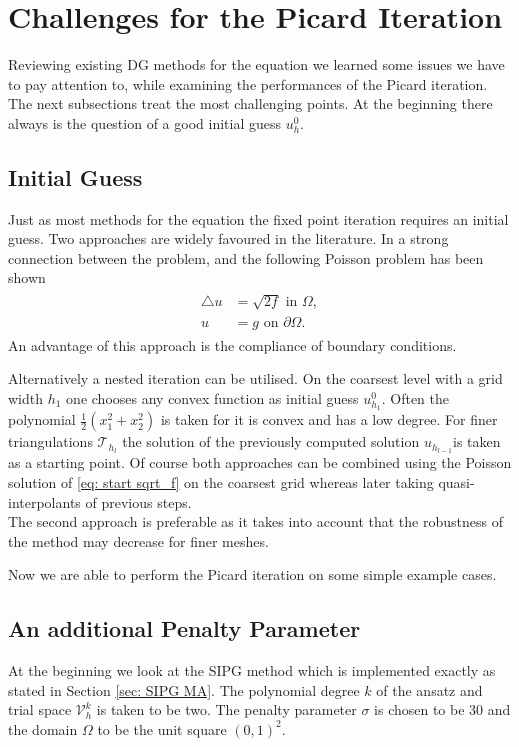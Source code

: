 \section{Challenges for the Picard Iteration}
Reviewing existing DG methods for the \MA equation we learned some issues we have to pay attention to, while examining the performances of the Picard iteration. The next subsections treat the most challenging points.
At the beginning there always is the question of a good initial guess $u_h^0$.
\subsection{Initial Guess}\label{sec: initial guess}
Just as most methods for the \MA equation the fixed point iteration requires an initial guess. Two approaches are widely favoured in the literature.
In \cite[Remark 2.1]{DG2006a} a strong connection between the \MA problem, and  the following Poisson problem has been shown
\begin{align}
	\begin{split}
	\triangle u &= \sqrt{2f} \text{ in } \Omega, \\ 
	u &= g \text{ on }\partial \Omega.
	\end{split}\label{eq: start sqrt_f}
\end{align}
An advantage of this approach is the compliance of boundary conditions.

Alternatively a nested iteration can be utilised. On the coarsest level with a grid width $h_1$ one chooses any convex function as initial guess $u^0_{h_1}$. Often the polynomial $\frac 1 2 ({x_1^2} + {x_2^2})$ is taken for it is convex and has a low degree. For finer triangulations $\mathcal{T}_{h_{l}}$ the solution of the previously computed solution $u_{h_{l-1}}$is taken as a starting point. Of course both approaches can be combined using the Poisson solution of \eqref{eq: start sqrt_f} on the coarsest grid whereas later taking quasi-interpolants of previous steps.\\
The second approach is preferable as it takes into account that the robustness of the method may decrease for finer meshes.

Now we are able to perform the Picard iteration on some simple example cases.
\subsection{An additional Penalty Parameter} \label{subsec: add penalty param}
At the beginning we look at the SIPG method which is implemented exactly as stated in Section \ref{sec: SIPG MA}. The polynomial degree $k$ of the ansatz and trial space $\mathcal V_h^k$ is taken to be two.
The penalty parameter $\sigma$ is chosen to be 30 and the domain $\Omega$ to be the unit square $(0,1)^2$.

